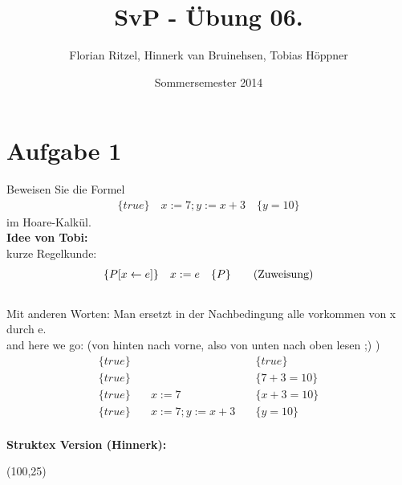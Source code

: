 \documentclass[ngerman,a4paper]{report}
\author{Florian Ritzel, Hinnerk van Bruinehsen, Tobias Höppner}
\title{SvP - Übung 06. }
\date{Sommersemester 2014}
\renewcommand{\maketitle}{}
\begin{document}
\maketitle
\section*{Aufgabe 1}
Beweisen Sie die Formel
\begin{align*}
\{true\}\quad
x:=7;y:=x+3\quad
\{y=10\}
\end{align*}
im Hoare-Kalkül.\\
\textbf{Idee von Tobi:}\\
kurze Regelkunde:
\begin{align}
\{P[x\leftarrow e]	\}\quad	x:=e 	\quad						\{P\}\tag{Zuweisung}\\
\notag
\end{align}
Mit anderen Worten: Man ersetzt in der Nachbedingung alle vorkommen von x durch e.\\
and here we go: (von hinten nach vorne, also von unten nach oben lesen ;) )
\begin{align*}
\{true\}\quad & 			\quad &\{true\} \\
\{true\}\quad &			\quad &\{7+3=10\} \tag{Zuweisung}\\
\{true\}\quad &	x:=7		\quad &\{x+3=10\} \tag{Zuweisung}\\
\{true\}\quad &	x:=7;y:=x+3		\quad &\{y=10\}\\
\end{align*}

\textbf{Struktex Version (Hinnerk):}\\
\begin{struktogramm}(100,25)
\end{struktogramm}\\
\end{document}
